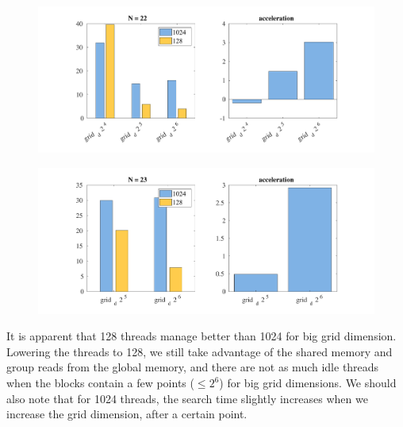 \documentclass[10pt,a4paper]{article}
\begin{document}
\begin{figure}[H]

\centering\includegraphics[scale=0.5]{threads22}
\end{figure}

\begin{figure}[H]

\centering\includegraphics[scale=0.5]{threads23}
\end{figure}



It is apparent that 128 threads manage better than 1024 for big grid dimension. Lowering the threads to 128, we still take advantage of the shared memory and group reads from the global memory, and there are not as much idle threads when the blocks contain a few points ($\leq2^{6}$) for big grid dimensions.
We should also note that for 1024 threads, the search time slightly increases when we increase the grid dimension, after a certain point.
\end{document}
